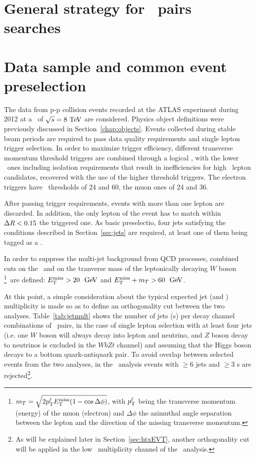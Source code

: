 \section{General strategy for \TTbar\ pairs searches}\label{sec:strategy}

\section{Data sample and common event preselection}\label{sec:presel}

The data from p-p collision events recorded at the ATLAS experiment during
2012 at a \cme\ of $\rts=8\tev$ are considered. Physics object definitions 
were previously discussed in Section~\ref{chap:objects}.
Events collected during
stable beam periods are required to pass data quality requirements and
single lepton trigger selection. In order to maximize trigger
efficiency, different transverse momentum threshold triggers are combined
through a logical \OR, with the lower \pt\ ones including isolation requirements
that result in inefficiencies for high \pt\ lepton candidates, recovered with
the use of the higher threshold triggers. The electron triggers have
\pt\ thresholds of 24 and 60\gev, the muon ones of 24 and 36\gev.

After passing trigger requirements, events with more than one lepton are
discarded. In addition, the only lepton of the event has to match within $\dr<0.15$ the
triggered one. As basic preselectio, four jets satisfying the conditions
described in Section~\ref{sec:jets} are required, at least one of them
being tagged as a \bjet.

In order to suppress the multi-jet background from QCD processes,
combined cuts on the \met\ and on the tranverse mass of the 
leptonically decaying $W$ boson \mt\footnote{$\mt = \sqrt{2 p^\ell_{\rm T} \met (1-\cos\Delta\phi)}$, with
$p^\ell_{\rm T}$  being the transverse momentum (energy) of the muon (electron) and $\Delta\phi$ the
azimuthal angle separation between the lepton and the direction of
the missing transverse momentum.}\ 
are defined: $\met>20~\gev$ and $\met+\mt>60~\gev$.

At this point, a simple consideration about the typical expected jet
(and \bjet) multiplicity is made so as to define an orthogonality
cut between the two analyses. Table~\ref{tab:jetmult} shows the 
number of jets (\bjet s) per decay channel combinations of \TTbar\ pairs, 
in the case of single lepton selection with at least four jets
(i.e. one $W$ boson will always decay into lepton and neutrino,
and $Z$ boson decay to neutrinos is excluded in the $WbZt$ channel) and assuming that
the Higgs boson decays to a bottom quark-antiquark pair.
To avoid overlap between selected events from the two analyses, in the
\wbx\ analysis events with $\geq$6 jets and $\geq$3 \bjet s are 
rejected\footnote{As will be explained later in Section~\ref{sec:htxEVT}, another orthogonality
cut will be applied in the low \bjet\ multiplicity channel of the \htx\ analysis.}.

